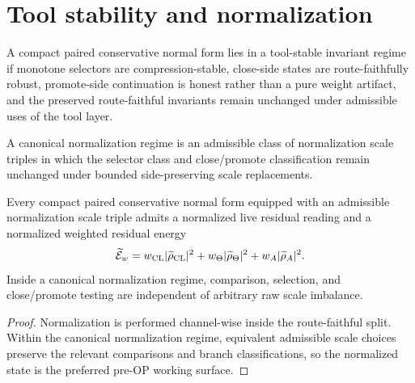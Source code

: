 \section{Tool stability and normalization}
\begin{definition}\label{def:tool-stable-invariant-regime}
A compact paired conservative normal form lies in a tool-stable invariant regime if monotone selectors are compression-stable, close-side states are route-faithfully robust, promote-side continuation is honest rather than a pure weight artifact, and the preserved route-faithful invariants remain unchanged under admissible uses of the tool layer.
\end{definition}

\begin{definition}\label{def:canonical-normalization-regime}
A canonical normalization regime is an admissible class of normalization scale triples in which the selector class and close/promote classification remain unchanged under bounded side-preserving scale replacements.
\end{definition}

\begin{theorem}\label{thm:normalization-theorem}
Every compact paired conservative normal form equipped with an admissible normalization scale triple admits a normalized live residual reading and a normalized weighted residual energy
\[
\widetilde{\mathcal{E}}_{w}=w_{\mathrm{CL}}|\widetilde{\rho}_{\mathrm{CL}}|^2+w_{\Theta}|\widetilde{\rho}_{\Theta}|^2+w_A|\widetilde{\rho}_{A}|^2.
\]
Inside a canonical normalization regime, comparison, selection, and close/promote testing are independent of arbitrary raw scale imbalance.
\end{theorem}

\begin{proof}
Normalization is performed channel-wise inside the route-faithful split. Within the canonical normalization regime, equivalent admissible scale choices preserve the relevant comparisons and branch classifications, so the normalized state is the preferred pre-OP working surface.
\end{proof}

